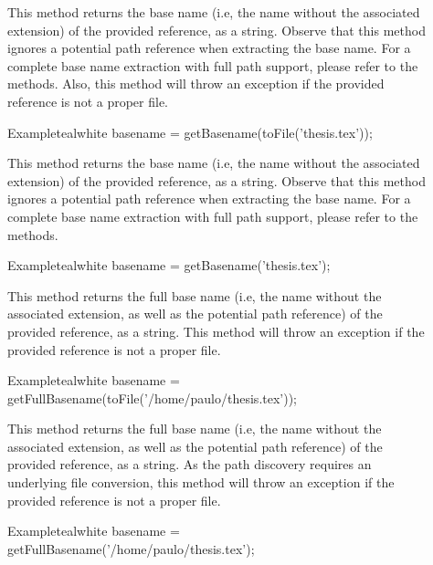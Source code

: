 \begin{description}
\item[] This method returns the base name (i.e, the name without the associated extension) of the provided  reference, as a string. Observe that this method ignores a potential path reference when extracting the base name. For a complete base name extraction with full path support, please refer to the  methods. Also, this method will throw an exception if the provided reference is not a proper file.

\begin{codebox}{Example}{teal}{\icnote}{white}
basename = getBasename(toFile('thesis.tex'));
\end{codebox}

\item[] This method returns the base name (i.e, the name without the associated extension) of the provided  reference, as a string. Observe that this method ignores a potential path reference when extracting the base name. For a complete base name extraction with full path support, please refer to the  methods.

\begin{codebox}{Example}{teal}{\icnote}{white}
basename = getBasename('thesis.tex');
\end{codebox}

\item[] This method returns the full base name (i.e, the name without the associated extension, as well as the potential path reference) of the provided  reference, as a string. This method will throw an exception if the provided reference is not a proper file.

\begin{codebox}{Example}{teal}{\icnote}{white}
basename = getFullBasename(toFile('/home/paulo/thesis.tex'));
\end{codebox}

\item[] This method returns the full base name (i.e, the name without the associated extension, as well as the potential path reference) of the provided  reference, as a string. As the path discovery requires an underlying file conversion, this method will throw an exception if the provided reference is not a proper file.

\begin{codebox}{Example}{teal}{\icnote}{white}
basename = getFullBasename('/home/paulo/thesis.tex');
\end{codebox}


\end{description}
